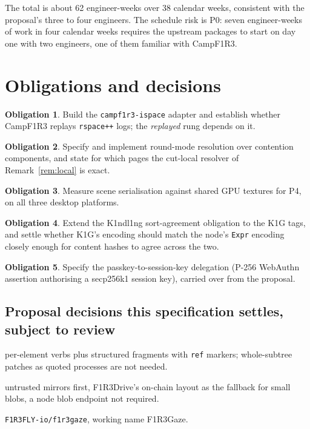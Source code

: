 \documentclass[11pt]{article}
\theoremstyle{definition}
\newtheorem{obligation}{Obligation}
\theoremstyle{remark}
\newcommand{\Camp}{CampF1R3}
\newcommand{\Kind}{K1ndl1ng}
\newcommand{\code}[1]{\texttt{#1}}
\newcommand{\Gz}{F1R3Gaze}
\begin{document}
\noindent
The total is about 62 engineer-weeks over 38 calendar weeks, consistent with the
proposal's three to four engineers. The schedule risk is P0: seven engineer-weeks of
work in four calendar weeks requires the upstream packages to start on day one with
two engineers, one of them familiar with \Camp{}.

\section{Obligations and decisions}\label{sec:open}

\begin{obligation}\label{ob2:replay}
Build the \code{campf1r3-ispace} adapter and establish whether \Camp{} replays
\code{rspace++} logs; the \emph{replayed} rung depends on it.
\end{obligation}

\begin{obligation}\label{ob2:round}
Specify and implement round-mode resolution over contention components, and state
for which pages the cut-local resolver of Remark~\ref{rem:local} is exact.
\end{obligation}

\begin{obligation}\label{ob2:ipc}
Measure scene serialisation against shared GPU textures for P4, on all three
desktop platforms.
\end{obligation}

\begin{obligation}
Extend the \Kind{} sort-agreement obligation to the K1G tags, and settle whether
K1G's encoding should match the node's \code{Expr} encoding closely enough for
content hashes to agree across the two.
\end{obligation}

\begin{obligation}
Specify the passkey-to-session-key delegation (P-256 WebAuthn assertion authorising
a secp256k1 session key), carried over from the proposal.
\end{obligation}

\subsection{Proposal decisions this specification settles, subject to review}
\begin{description}[leftmargin=1.5em,style=nextline,itemsep=2pt]
\item[DOM granularity] per-element verbs plus structured fragments with
  \code{ref} markers; whole-subtree patches as quoted processes are not needed.
\item[Blob storage] untrusted mirrors first, F1R3Drive's on-chain layout as the
  fallback for small blobs, a node blob endpoint not required.
\item[Repository and name] \code{F1R3FLY-io/f1r3gaze}, working name \Gz{}.
\end{description}
\end{document}
